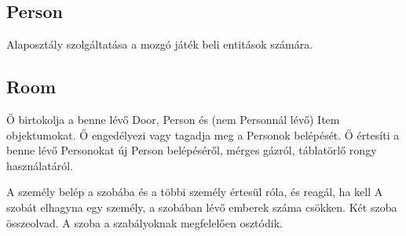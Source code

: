 \subsection{Person}
\begin{class-template-responsibility}
    Alaposztály szolgáltatása a mozgó játék beli entitások számára.
\end{class-template-responsibility}
\begin{class-template-attribute}
\end{class-template-attribute}
\begin{class-template-method}
\end{class-template-method}

\subsection{Room}
\begin{class-template-responsibility}
    Ő birtokolja a benne lévő Door, Person és (nem Personnál lévő) Item objektumokat.
    Ő engedélyezi vagy tagadja meg a Personok belépését.
    Ő értesíti a benne lévő Personokat új Person belépéséről, mérges gázról, táblatörlő rongy használatáról. 
    \end{class-template-responsibility}
\begin{class-template-attribute}
\end{class-template-attribute}
\begin{class-template-method}
     { A személy belép a szobába és a többi személy értesül róla, és reagál, ha kell }
     { A szobát elhagyna egy személy, a szobában lévő emberek száma csökken. }
     { Két szoba összeolvad. }
     {A szoba a szabályoknak megfelelően osztódik.}
\end{class-template-method}

